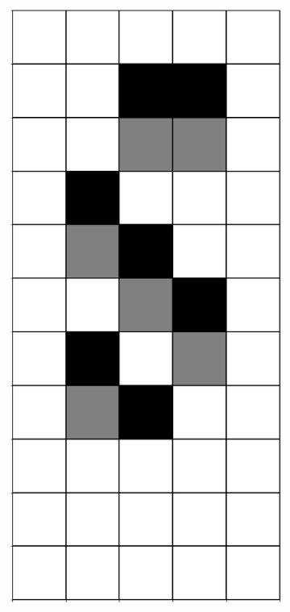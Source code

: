 \documentclass[12pt]{article}
\numberwithin{figure}{section} %
\begin{document}
\begin{figure}[H]
\begin{subfigure}{0.3\textwidth}
     		\subcaption{}
   	\end{subfigure}
        \begin{subfigure}{0.3\textwidth}
     		\centering
     		\includegraphics[angle=270,width=\linewidth]{Section4/4.2}

\end{subfigure}
\end{figure}
\end{document}
